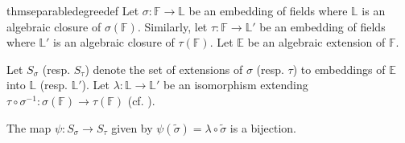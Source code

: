 \begin{restatable}[]{thm}{separabledegreedef}
\label{thm:separabledegreedef}
    Let $\sigma : \mathbb{F} \to \mathbb{L}$ be an embedding of fields where $\mathbb{L}$ is an algebraic closure of $\sigma(\mathbb{F}).$ Similarly, let $\tau : \mathbb{F} \to \mathbb{L}'$ be an embedding of fields where $\mathbb{L}'$ is an algebraic closure of $\tau(\mathbb{F}).$ Let $\mathbb{E}$ be an algebraic extension of $\mathbb{F}.$

    Let $S_\sigma$ (resp. $S_\tau$) denote the set of extensions of $\sigma$ (resp. $\tau$) to embeddings of $\mathbb{E}$ into $\mathbb{L}$ (resp. $\mathbb{L}'$). Let $\lambda : \mathbb{L} \to \mathbb{L}'$ be an isomorphism extending $\tau \circ \sigma^{-1} : \sigma(\mathbb{F}) \to \tau(\mathbb{F})$ (cf. ).

    The map $\psi : S_\sigma \to S_\tau$ given by $\psi(\widetilde{\sigma}) = \lambda \circ \widetilde{\sigma}$ is a bijection. \hfill\hyperref[thm:separabledegreedef2]{\downsym}

    \begin{center}
    \end{center}  
\end{restatable}

